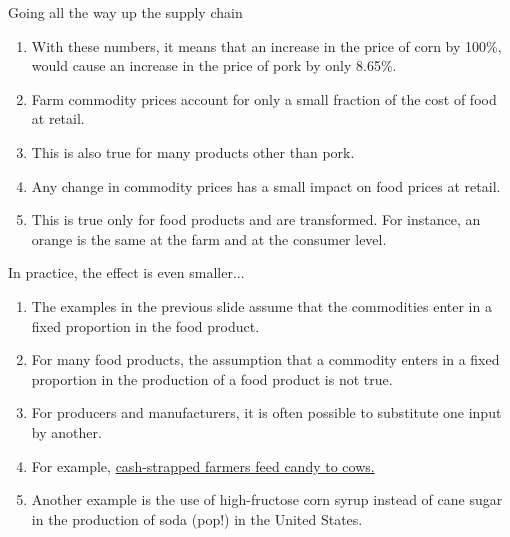 \documentclass[table,xcolor=pdftex,dvipsnames, handout]{beamer}\usepackage[]{graphicx}\usepackage[]{color}
\begin{document}

\begin{frame}{Going all the way up the supply chain}
\begin{enumerate}[label=\textbullet]
  \item With these numbers, it means that an increase in the price of corn by 100\%, would cause an increase in the price of pork by only 8.65\%.
  \item Farm commodity prices account for only a small fraction of the cost of food at retail.
  \item This is also true for many products other than pork.
  \item Any change in commodity prices has a small impact on food prices at retail.
  \item This is true only for food products and are transformed. For instance, an orange is the same at the farm and at the consumer level.
\end{enumerate}
\end{frame}


\begin{frame}{In practice, the effect is even smaller...}
\begin{enumerate}[label=\textbullet]
  \item The examples in the previous slide assume that the commodities enter in a fixed proportion in the food product.
  \item For many food products, the assumption that a commodity enters in a fixed proportion in the production of a food product is not true.
  \item For producers and manufacturers, it is often possible to substitute one input by another.
  \item For example, \href{http://money.cnn.com/2012/10/10/news/economy/farmers-cows-candy-feed/index.html}{cash-strapped farmers feed candy to cows.}
  \item Another example is the use of high-fructose corn syrup instead of cane sugar in the production of soda (pop!) in the United States.
\end{enumerate}
\end{frame}

\end{document}
